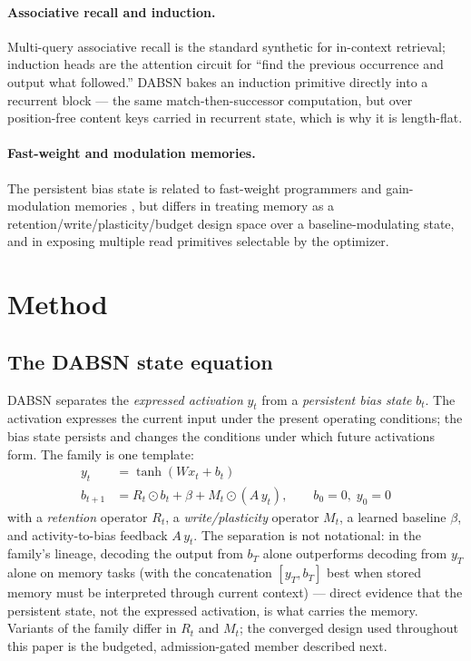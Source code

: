 \documentclass[11pt]{article}
\newcommand{\model}{DABSN}
\begin{document}
\paragraph{Associative recall and induction.} Multi-query associative recall
\citep{arora2023zoology} is the standard synthetic for in-context retrieval;
induction heads \citep{olsson2022context} are the attention circuit for
``find the previous occurrence and output what followed.'' \model{} bakes an
induction primitive directly into a recurrent block --- the same
match-then-successor computation, but over position-free content keys carried
in recurrent state, which is why it is length-flat.

\paragraph{Fast-weight and modulation memories.} The persistent bias state is
related to fast-weight programmers and gain-modulation memories
\citep{schmidhuber1992learning,ba2016using,schlag2021linear}, but differs in
treating memory as a retention/write/plasticity/budget design space over a
baseline-modulating state, and in exposing multiple read primitives
selectable by the optimizer.

\section{Method}
\label{sec:method}

\subsection{The \model{} state equation}

\model{} separates the \emph{expressed activation} $y_t$ from a
\emph{persistent bias state} $b_t$. The activation expresses the current input
under the present operating conditions; the bias state persists and changes
the conditions under which future activations form. The family is one
template:
\begin{align}
y_t &= \tanh(W x_t + b_t) \nonumber\\
b_{t+1} &= R_t \odot b_t + \beta + M_t \odot (A\,y_t), \qquad b_0 = 0,\; y_0 = 0
\end{align}
with a \emph{retention} operator $R_t$, a \emph{write/plasticity} operator
$M_t$, a learned baseline $\beta$, and activity-to-bias feedback $A\,y_t$.
The separation is not notational: in the family's lineage, decoding the
output from $b_T$ alone outperforms decoding from $y_T$ alone on memory
tasks (with the concatenation $[y_T, b_T]$ best when stored memory must be
interpreted through current context) --- direct evidence that the persistent
state, not the expressed activation, is what carries the memory. Variants of
the family differ in $R_t$ and $M_t$; the converged design used throughout
this paper is the budgeted, admission-gated member described next.
\end{document}
